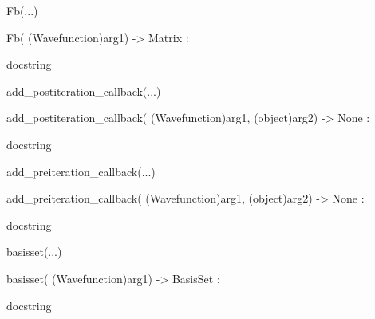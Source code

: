 \documentclass[letterpaper,10pt,english]{sphinxmanual}
\begin{document}
\begin{description}
\begin{description}
\begin{DUlineblock}{0em}
\begin{DUlineblock}{\DUlineblockindent}
\begin{DUlineblock}{\DUlineblockindent}
\end{DUlineblock}
\end{DUlineblock}
\item[] Fb(...)
\item[]
\begin{DUlineblock}{\DUlineblockindent}
\item[] Fb( (Wavefunction)arg1) -\textgreater{} Matrix :
\item[]
\begin{DUlineblock}{\DUlineblockindent}
\item[] docstring
\item[] 
\end{DUlineblock}
\end{DUlineblock}
\item[] add\_postiteration\_callback(...)
\item[]
\begin{DUlineblock}{\DUlineblockindent}
\item[] add\_postiteration\_callback( (Wavefunction)arg1, (object)arg2) -\textgreater{} None :
\item[]
\begin{DUlineblock}{\DUlineblockindent}
\item[] docstring
\item[] 
\end{DUlineblock}
\end{DUlineblock}
\item[] add\_preiteration\_callback(...)
\item[]
\begin{DUlineblock}{\DUlineblockindent}
\item[] add\_preiteration\_callback( (Wavefunction)arg1, (object)arg2) -\textgreater{} None :
\item[]
\begin{DUlineblock}{\DUlineblockindent}
\item[] docstring
\item[] 
\end{DUlineblock}
\end{DUlineblock}
\item[] basisset(...)
\item[]
\begin{DUlineblock}{\DUlineblockindent}
\item[] basisset( (Wavefunction)arg1) -\textgreater{} BasisSet :
\item[]
\begin{DUlineblock}{\DUlineblockindent}
\item[] docstring

\end{DUlineblock}
\end{DUlineblock}
\end{DUlineblock}
\end{description}
\end{description}
\end{document}
